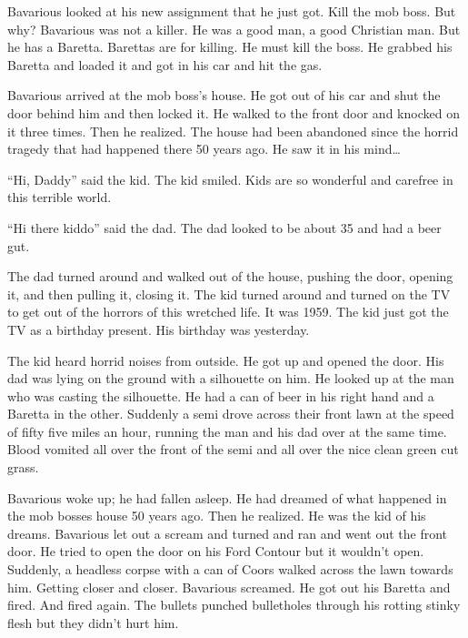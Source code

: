 Bavarious looked at his new assignment that he just got. Kill the
mob boss. But why? Bavarious was not a killer. He was a good man, a
good Christian man. But he has a Baretta. Barettas are for killing.
He must kill the boss. He grabbed his Baretta and loaded it and got
in his car and hit the gas.



Bavarious arrived at the mob boss's house. He got out of his car
and shut the door behind him and then locked it. He walked to the
front door and knocked on it three times. Then he realized. The
house had been abandoned since the horrid tragedy that had happened
there 50 years ago. He saw it in his mind{\ldots}



``Hi, Daddy'' said the kid. The kid smiled. Kids are so wonderful and
carefree in this terrible world.

``Hi there kiddo'' said the dad. The dad looked to be about 35 and
had a beer gut.

The dad turned around and walked out of the house, pushing the
door, opening it, and then pulling it, closing it. The kid turned
around and turned on the TV to get out of the horrors of this
wretched life. It was 1959. The kid just got the TV as a birthday
present. His birthday was yesterday.



The kid heard horrid noises from outside. He got up and opened the
door. His dad was lying on the ground with a silhouette on him. He
looked up at the man who was casting the silhouette. He had a can
of beer in his right hand and a Baretta in the other. Suddenly a
semi drove across their front lawn at the speed of fifty five miles
an hour, running the man and his dad over at the same time. Blood
vomited all over the front of the semi and all over the nice clean
green cut grass.





Bavarious woke up; he had fallen asleep. He had dreamed of what
happened in the mob bosses house 50 years ago. Then he realized. He
was the kid of his dreams. Bavarious let out a scream and turned
and ran and went out the front door. He tried to open the door on
his Ford Contour but it wouldn't open. Suddenly, a headless corpse
with a can of Coors walked across the lawn towards him. Getting
closer and closer. Bavarious screamed. He got out his Baretta and
fired. And fired again. The bullets punched bulletholes through his
rotting stinky flesh but they didn't hurt him.



